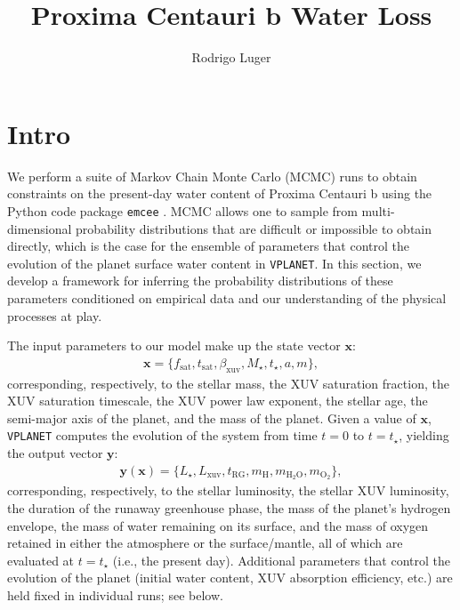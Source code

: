 \documentclass[]{emulateapj}
\begin{document}
\title{Proxima Centauri b Water Loss}
\author{Rodrigo Luger}


\section{Intro}
\label{sec:intro}

We perform a suite of Markov Chain Monte Carlo (MCMC) runs to obtain constraints on the
present-day water content of Proxima Centauri b using the Python code package \texttt{emcee}
\citep{ForemanMackey13}. MCMC allows one to sample from multi-dimensional probability 
distributions that are difficult or impossible to obtain directly, which is the case for
the ensemble of parameters that control the evolution of the planet surface water content
in \texttt{VPLANET}. In this section, we develop a framework for inferring the probability 
distributions of these parameters conditioned on empirical data and our understanding
of the physical processes at play.

The input parameters to our model make up the state vector $\mathbf{x}$:
%
\begin{align}
\label{eq:mcmcx}
\mathbf{x} = \{f_\mathrm{sat}, t_\mathrm{sat}, \beta_\mathrm{xuv}, M_\star, t_\star, a, m\},
\end{align}
%
corresponding, respectively, to the stellar mass, the XUV saturation fraction, the XUV saturation timescale,
the XUV power law exponent, the stellar age, the semi-major axis of the planet, and the
mass of the planet. Given a value of $\mathbf{x}$, \texttt{VPLANET} computes the evolution of the system from
time $t = 0$ to $t = t_\star$, yielding the output vector $\mathbf{y}$:
%
\begin{align}
\label{eq:mcmcy}
\mathbf{y}(\mathbf{x}) = \{L_\star, L_\mathrm{xuv}, t_\mathrm{RG}, m_\mathrm{H}, m_\mathrm{H_2O}, m_\mathrm{O_2}\},
\end{align}
%
corresponding, respectively, to the stellar luminosity, the stellar XUV luminosity, the duration of the 
runaway greenhouse phase, the mass of the
planet's hydrogen envelope, the mass of water remaining on its surface, and the mass of oxygen retained
in either the atmosphere or the surface/mantle, all of which are evaluated at $t = t_\star$ (i.e., the present day). 
Additional parameters that control the evolution of the 
planet (initial water content, XUV absorption efficiency, etc.) are held fixed in individual runs; see below.
\end{document}
